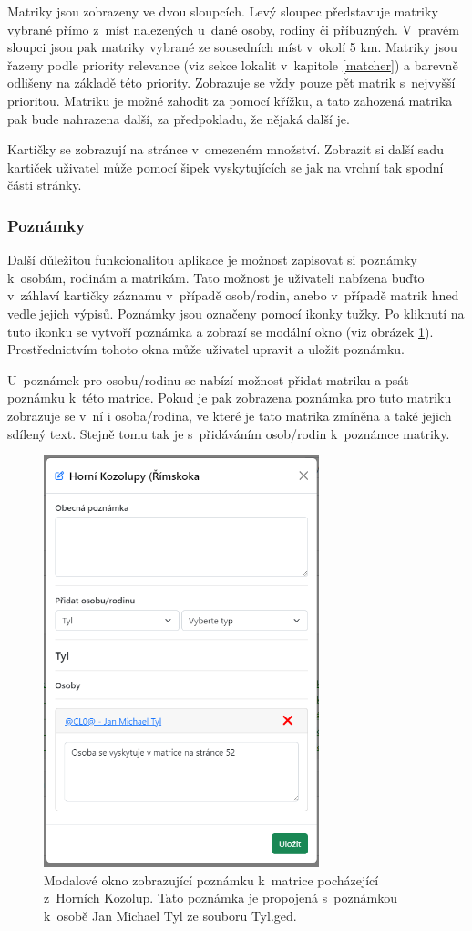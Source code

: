 Matriky jsou zobrazeny ve dvou sloupcích. Levý sloupec představuje matriky vybrané přímo z~míst nalezených u~dané osoby, rodiny či příbuzných. V~pravém sloupci jsou pak matriky vybrané ze sousedních míst v~okolí 5 km. Matriky jsou řazeny podle priority relevance (viz sekce lokalit v~kapitole \ref{matcher}) a barevně odlišeny na základě této priority. Zobrazuje se vždy pouze pět matrik s~nejvyšší prioritou. Matriku je možné zahodit za pomocí křížku, a tato zahozená matrika pak bude nahrazena další, za předpokladu, že nějaká další je.

Kartičky se zobrazují na stránce v~omezeném množství. Zobrazit si další sadu kartiček uživatel může pomocí šipek vyskytujících se jak na vrchní tak spodní části stránky.

\subsubsection{Poznámky}
Další důležitou funkcionalitou aplikace je možnost zapisovat si poznámky k~osobám, rodinám a matrikám. Tato možnost je uživateli nabízena buďto v~záhlaví kartičky záznamu v~případě osob/rodin, anebo v~případě matrik hned vedle jejich výpisů. Poznámky jsou označeny pomocí ikonky tužky. Po kliknutí na tuto ikonku se vytvoří poznámka a zobrazí se modální okno (viz obrázek \ref{figure_note}). Prostřednictvím tohoto okna může uživatel upravit a uložit poznámku.

U~poznámek pro osobu/rodinu se nabízí možnost přidat matriku a psát poznámku k~této matrice. Pokud je pak zobrazena poznámka pro tuto matriku zobrazuje se v~ní i osoba/rodina, ve které je tato matrika zmíněna a také jejich sdílený text. Stejně tomu tak je s~přidáváním osob/rodin k~poznámce matriky.

\begin{figure}[H]
	\centering
	\includegraphics[width=80mm]{obrazky-figures/poznamka.png}
	\caption[Modalové okno zobrazující poznámku]{Modalové okno zobrazující poznámku k~matrice pocházející z~Horních Kozolup. Tato poznámka je propojená s~poznámkou k~osobě Jan Michael Tyl ze souboru Tyl.ged.}
	\label{figure_note}
\end{figure}

